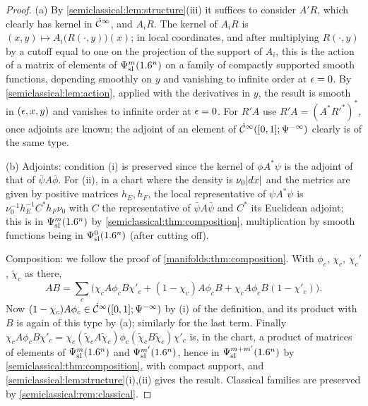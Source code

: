\begin{proof}
  (a) By \cref{semiclassical:lem:structure}(iii) it suffices to consider $A'R$,
  which clearly has kernel in $\dot{\mathcal{C}}^\infty$, and $A_iR$. The kernel of $A_iR$ is
  $(x,y)\mapsto A_i\bigl(R(\cdot,y)\bigr)(x)$; in local coordinates, and after
  multiplying $R(\cdot,y)$ by a cutoff equal to one on the projection of the
  support of $A_i$, this is the action of a matrix of elements of $\Psi^{m}_{\mathrm{sl}}(1.6^n)$ on
  a family of compactly supported smooth functions, depending smoothly on $y$ and
  vanishing to infinite order at $\epsilon=0$. By \cref{semiclassical:lem:action},
  applied with the derivatives in $y$, the result is smooth in $(\epsilon,x,y)$ and
  vanishes to infinite order at $\epsilon=0$. For $R'A$ use $R'A=(A^*R'^*)^*$, once
  adjoints are known; the adjoint of an element of $\dot{\mathcal{C}}^\infty([0,1];\Psi^{-\infty})$
  clearly is of the same type.

  (b) Adjoints: condition (i) is preserved since the kernel of $\phi A^*\psi$ is the
  adjoint of that of $\bar\psi A\bar\phi$. For (ii), in a chart where the density
  is $\nu_0\lvert dx\rvert$ and the metrics are given by positive matrices $h_E,h_F$, the
  local representative of $\psi A^*\psi$ is $\nu_0^{-1}h_E^{-1}C^*h_F\nu_0$ with $C$ the
  representative of $\bar\psi A\bar\psi$ and $C^*$ its Euclidean adjoint; this is in
  $\Psi^{m}_{\mathrm{sl}}(1.6^n)$ by \cref{semiclassical:thm:composition}, multiplication by
  smooth functions being in $\Psi^{0}_{\mathrm{sl}}(1.6^n)$ (after cutting off).

  Composition: we follow the proof of \cref{manifolds:thm:composition}. With
  $\phi_c$, $\chi_c$, $\chi_c'$, $\tilde\chi_c$ as there,
  \begin{equation*}
    AB=\sum_c\bigl(\chi_cA\phi_cB\chi'_c+(1-\chi_c)A\phi_cB+\chi_cA\phi_cB(1-\chi'_c)\bigr).
  \end{equation*}
  Now $(1-\chi_c)A\phi_c\in\dot{\mathcal{C}}^\infty([0,1];\Psi^{-\infty})$ by (i) of the definition, and
  its product with $B$ is again of this type by (a); similarly for the last term.
  Finally $\chi_cA\phi_cB\chi'_c=\chi_c(\tilde\chi_cA\tilde\chi_c)\phi_c(\tilde\chi_cB\tilde\chi_c)\chi'_c$
  is, in the chart, a product of matrices of elements of $\Psi^{m}_{\mathrm{sl}}(1.6^n)$ and
  $\Psi^{m'}_{\mathrm{sl}}(1.6^n)$, hence in $\Psi^{m+m'}_{\mathrm{sl}}(1.6^n)$ by
  \cref{semiclassical:thm:composition}, with compact support, and
  \cref{semiclassical:lem:structure}(i),(ii) gives the result. Classical families
  are preserved by \cref{semiclassical:rem:classical}.


\end{proof}
